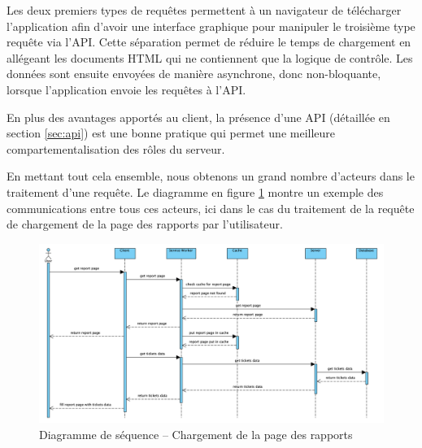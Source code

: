 \documentclass{EPL-master-thesis-covers-FR}
\begin{document}
				Les deux premiers types de requêtes permettent à un navigateur de télécharger l'application afin d'avoir une interface graphique pour manipuler le troisième type requête via l'API. Cette séparation permet de réduire le temps de chargement en allégeant les documents HTML qui ne contiennent que la logique de contrôle. Les données sont ensuite envoyées de manière asynchrone, donc non-bloquante, lorsque l'application envoie les requêtes à l'API.

				En plus des avantages apportés au client, la présence d'une API (détaillée en section \ref{sec:api}) est une bonne pratique qui permet une meilleure compartementalisation des rôles du serveur.

				En mettant tout cela ensemble, nous obtenons un grand nombre d'acteurs dans le traitement d'une requête. Le diagramme en figure \ref{fig:sequence} montre un exemple des communications entre tous ces acteurs, ici dans le cas du traitement de la requête de chargement de la page des rapports par l'utilisateur.

				\begin{figure}
					\includegraphics[width=\textwidth]{images/sequence}
					\caption{Diagramme de séquence -- Chargement de la page des rapports}
					\label{fig:sequence}
				\end{figure}

\end{document}
